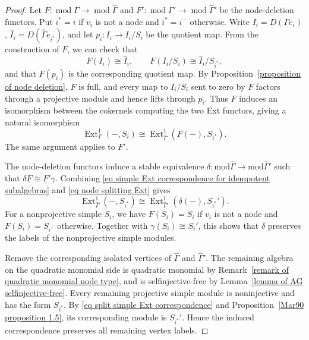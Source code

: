 \documentclass[11pt]{article}
\newcommand{\Ext}{\operatorname{Ext}}
\renewcommand{\mod}{\operatorname{mod}}
\newcommand{\smod}{\operatorname{\underline{mod}}}
\providecommand{\varGamma}{\Gamma}
\theoremstyle{definition}
\begin{document}
\begin{proof}
			Let $F:\mod\varGamma\to\mod \widehat{\varGamma}$ and $F':\mod\varGamma'\to\mod \widehat{\varGamma}'$ be the node-deletion functors.
			Put $i^*=i$ if $v_i$ is not a node and $i^*=i^-$ otherwise.
			Write $I_i=D(\varGamma e_i)$, $\widehat{I}_i=D(\widehat{\varGamma}e_{i^*})$, and let $p_i:I_i\to I_i/S_i$ be the quotient map.
			From the construction of $F$, we can check that
			\[
				F(I_i)\cong \widehat{I}_i,\qquad
				F(I_i/S_i)\cong \widehat{I}_i/S_{i^*},
			\]
			and that $F(p_i)$ is the corresponding quotient map.
			By Proposition~\ref{proposition of node deletion}, $F$ is full, and every map to $I_i/S_i$ sent to zero by $F$ factors through a projective module and hence lifts through $p_i$.
			Thus $F$ induces an isomorphism between the cokernels computing the two Ext functors, giving a natural isomorphism
			\begin{equation}\label{eq node splitting Ext}
				\Ext^1_\varGamma(-,S_i)
				\cong\Ext^1_{\widehat{\varGamma}}(F(-),S_{i^*}).
			\end{equation}
			The same argument applies to $F'$.

			The node-deletion functors induce a stable equivalence $\delta:\smod \widehat{\varGamma}\to\smod \widehat{\varGamma}'$ such that $\delta\underline F\cong\underline F'\gamma$.
			Combining \eqref{eq simple Ext correspondence for idempotent subalgebras} and \eqref{eq node splitting Ext} gives
			\begin{equation}\label{eq split simple Ext correspondence}
				\Ext^1_{\widehat{\varGamma}}(-,S_{i^*})
				\cong\Ext^1_{\widehat{\varGamma}'}(\delta(-),S_{i^*}').
			\end{equation}
			For a nonprojective simple $S_i$, we have $F(S_i)=S_i$ if $v_i$ is not a node and $F(S_i)=S_{i^+}$ otherwise.
			Together with $\gamma(S_i)\cong S_i'$, this shows that $\delta$ preserves the labels of the nonprojective simple modules.

			Remove the corresponding isolated vertices of $\widehat{\varGamma}$ and $\widehat{\varGamma}'$.
			The remaining algebra on the quadratic monomial side is quadratic monomial by Remark~\ref{remark of quadratic monomial node type}, and is selfinjective-free by Lemma~\ref{lemma of AG selfinjective-free}.
			Every remaining projective simple module is noninjective and has the form $S_{i^*}$.
			By \eqref{eq split simple Ext correspondence} and Proposition~\ref{Mar90 proposition 1.5}, its corresponding module is $S_{i^*}'$.
			Hence the induced correspondence preserves all remaining vertex labels.


\end{proof}
\end{document}

